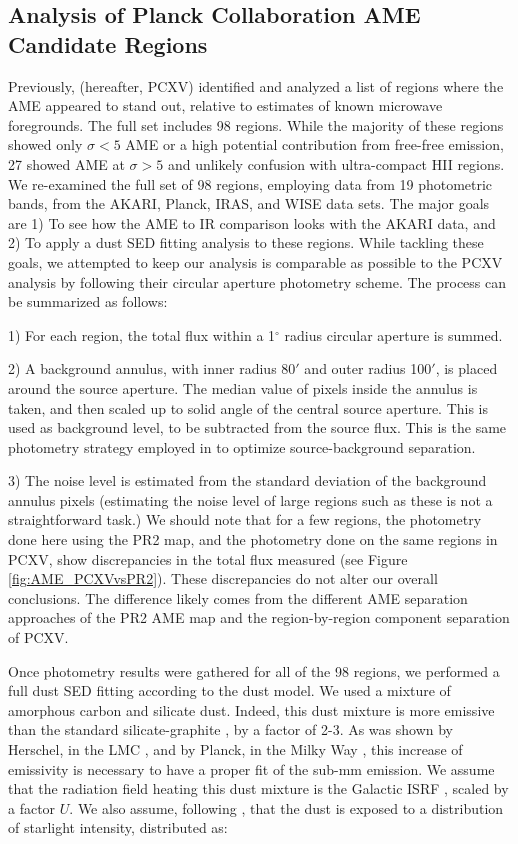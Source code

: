 \documentclass[preprint2,longabstract]{aastex}
\begin{document}
\subsection{Analysis of Planck Collaboration AME Candidate Regions}

     Previously, \cite{planckXV} (hereafter, PCXV) identified and analyzed a list of regions where the AME appeared to stand out, relative to estimates of known microwave foregrounds. The full set includes 98 regions. While the majority of these regions showed only $\sigma{} < 5$ AME or a high potential contribution from free-free emission, 27 showed AME at $\sigma{} > 5$ and unlikely confusion with ultra-compact HII regions. We re-examined the full set of 98 regions, employing data from 19 photometric bands, from the AKARI, Planck, IRAS, and WISE data sets. The major goals are 1) To see how the AME to IR comparison looks with the AKARI data, and 2) To apply a dust SED fitting analysis to these regions. While tackling these goals, we attempted to keep our analysis is comparable as possible to the PCXV analysis by following their circular aperture photometry scheme. The process can be summarized as follows:

     1) For each region, the total flux within a 1$^{\circ}$ radius circular aperture is summed.

     2) A background annulus, with inner radius 80$'$ and outer radius 100$'$, is placed around the source aperture. The median value of pixels inside the annulus is taken, and then scaled up to solid angle of the central source aperture. This is used as background level, to be subtracted from the source flux. This is the same photometry strategy employed in \cite{planckXV} to optimize source-background separation.

     3) The noise level is estimated from the standard deviation of the background annulus pixels (estimating the noise level of large regions such as these is not a straightforward task.) We should note that for a few regions, the photometry done here using the PR2 map, and the photometry done on the same regions in PCXV, show discrepancies in the total flux measured (see Figure \ref{fig:AME_PCXVvsPR2}). These discrepancies do not alter our overall conclusions. The difference likely comes from the different AME separation approaches of the PR2 AME map and the region-by-region component separation of PCXV.

     Once photometry results were gathered for all of the 98 regions, we performed a full dust SED fitting according to the \cite{galliano11} dust model. We used a mixture of amorphous carbon and silicate dust. Indeed, this dust mixture is more emissive than the standard silicate-graphite \citep{draine07}, by a factor of 2-3. As was shown by Herschel, in the LMC \citep{galliano11}, and by Planck, in the Milky Way \citep{planck16}, this increase of emissivity is necessary to have a proper fit of the sub-mm emission. We assume that the radiation field heating this dust mixture is the Galactic ISRF \citep{math83}, scaled by a factor $U$. We also assume, following \cite{dale01}, that the dust is exposed to a distribution of starlight intensity, distributed as:
\end{document}
